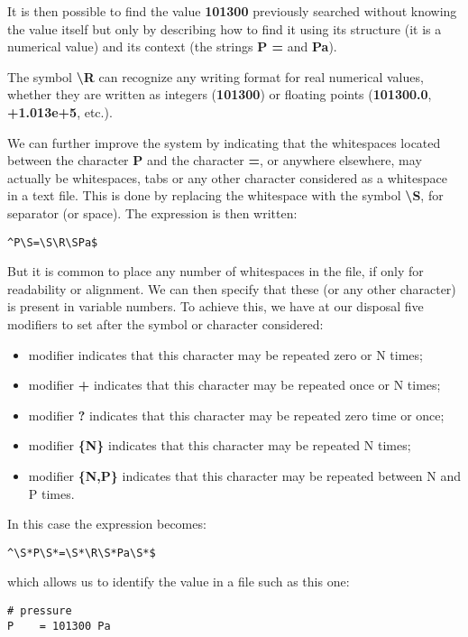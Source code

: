 It is then possible to find the value {\bf 101300} previously searched without knowing the value itself but only by describing how to find it using its structure (it is a numerical value) and its context (the strings {\bf P = } and {\bf Pa}).

The symbol {\bf \textbackslash R} can recognize any writing format for real numerical values, whether they are written as integers ({\bf 101300}) or floating points ({\bf 101300.0}, {\bf +1.013e+5}, etc.).

We can further improve the system by indicating that the whitespaces located between the character {\bf P} and the character {\bf =}, or anywhere elsewhere, may actually be whitespaces, tabs or any other character considered as a whitespace in a text file. This is done by replacing the whitespace with the symbol {\bf \textbackslash S}, for separator (or space). The expression is then written:

\lstset{language=C++, basicstyle=\normalsize}
\begin{lstlisting}[frame=TBRL]
^P\S=\S\R\SPa$
\end{lstlisting}

But it is common to place any number of whitespaces in the file, if only for readability or alignment. We can then specify that these (or any other character) is present in variable numbers. To achieve this, we have at our disposal five modifiers to set after the symbol or character considered:
\begin{itemize}
\item modifier {\bf *} indicates that this character may be repeated zero or N times;
\item modifier {\bf +} indicates that this character may be repeated once or N times;
\item modifier {\bf ?} indicates that this character may be repeated zero time or once;
\item modifier {\bf \{N\} } indicates that this character may be repeated N times;
\item modifier {\bf \{N,P\}} indicates that this character may be repeated between N and P times.
\end{itemize}

In this case the expression becomes:
\lstset{language=C++, basicstyle=\normalsize}
\begin{lstlisting}[frame=TBRL]
^\S*P\S*=\S*\R\S*Pa\S*$
\end{lstlisting}

which allows us to identify the value in a file such as this one:
\lstset{language=C++, basicstyle=\normalsize}
\begin{lstlisting}[frame=TBRL]
# pressure
P    = 101300 Pa
\end{lstlisting}

